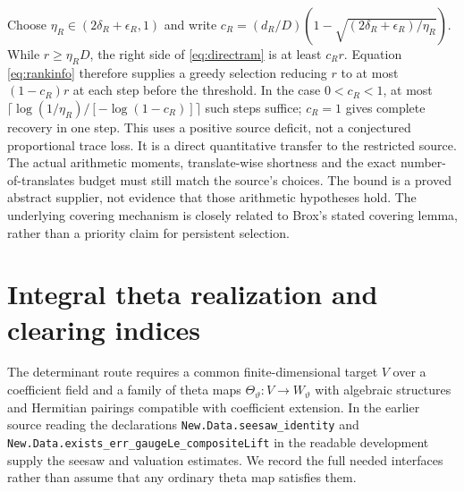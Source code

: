 \documentclass[11pt,a4paper]{article}
\begin{document}
Choose $\eta_R\in(2\delta_R+\epsilon_R,1)$ and write $c_R=(d_R/D)(1-\sqrt{(2\delta_R+\epsilon_R)/\eta_R})$. While $r\geq\eta_RD$, the right side of \eqref{eq:directram} is at least $c_Rr$. Equation \eqref{eq:rankinfo} therefore supplies a greedy selection reducing $r$ to at most $(1-c_R)r$ at each step before the threshold. In the case $0<c_R<1$, at most $\lceil\log(1/\eta_R)/[-\log(1-c_R)]\rceil$ such steps suffice; $c_R=1$ gives complete recovery in one step. This uses a positive source deficit, not a conjectured proportional trace loss. It is a direct quantitative transfer to the restricted source. The actual arithmetic moments, translate-wise shortness and the exact number-of-translates budget must still match the source's choices. The bound is a proved abstract supplier, not evidence that those arithmetic hypotheses hold. The underlying covering mechanism is closely related to Brox's stated covering lemma, rather than a priority claim for persistent selection.


\section{Integral theta realization and clearing indices}\label{sec:theta}
The determinant route requires a common finite-dimensional target $V$ over a coefficient field and a family of theta maps $\Theta_\vartheta:V\to W_\vartheta$ with algebraic structures and Hermitian pairings compatible with coefficient extension. In the earlier source reading the declarations \texttt{New.Data.seesaw\_\allowbreak identity} and \texttt{New.Data.exists\_\allowbreak err\_\allowbreak gaugeLe\_\allowbreak compositeLift} in the readable development supply the seesaw and valuation estimates. We record the full needed interfaces rather than assume that any ordinary theta map satisfies them.
\end{document}
